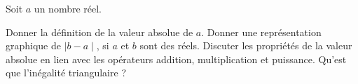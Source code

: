 %
%
	Soit $a$ un nombre réel.
	\begin{tasks}
		\task Donner la définition de la valeur absolue de  $a$.
		\task Donner une représentation graphique de $\mid b-a\mid$, si $a$ et $b$ sont des réels.
		\task Discuter les propriétés de la valeur absolue en lien avec les opérateurs addition, multiplication et puissance.
		\task Qu'est que l'inégalité triangulaire ?
	\end{tasks}

